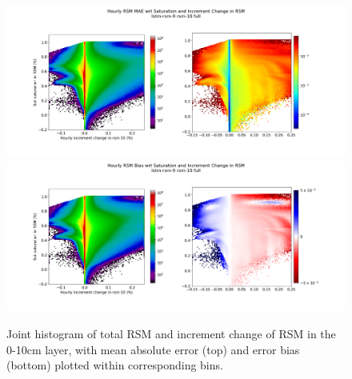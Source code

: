 \begin{figure}[hp!]
    \centering

    \includegraphics[width=.96\linewidth,draft=false]{figures/grid-eval_lstm-rsm-9_full/eval-grid_full_lstm-rsm-9_rsm-10_hist-state-increment_abs-err.png}
    \includegraphics[width=.96\linewidth,draft=false]{figures/grid-eval_lstm-rsm-9_full/eval-grid_full_lstm-rsm-9_rsm-10_hist-state-increment_bias.png}

    \caption{Joint histogram of total RSM and increment change of RSM in the 0-10cm layer, with mean absolute error (top) and error bias (bottom) plotted within corresponding bins.}
    \label{acclstm-rsm-9-sihist-rsm-10}
\end{figure}

